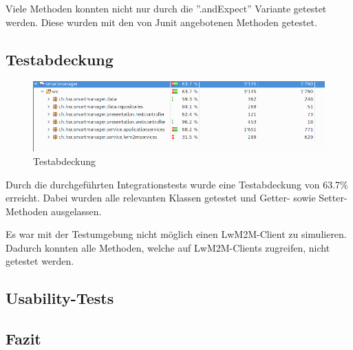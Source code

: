 Viele Methoden konnten nicht nur durch die ''.andExpect'' Variante getestet werden. Diese wurden mit den von Junit angebotenen Methoden getestet.
\subsection{Testabdeckung}
\begin{figure}[H]
\centering
\includegraphics[scale=0.5]{../04_Realisierung/images/testcoverage.png}
\caption{Testabdeckung}
\end{figure}

Durch die durchgeführten Integrationstests wurde eine Testabdeckung von 63.7\% erreicht. Dabei wurden alle relevanten Klassen getestet und Getter- sowie Setter-Methoden ausgelassen.

Es war mit der Testumgebung nicht möglich einen LwM2M-Client zu simulieren. Dadurch konnten alle Methoden, welche auf LwM2M-Clients zugreifen, nicht getestet werden.
\subsection{Usability-Tests}

\subsection{Fazit}
